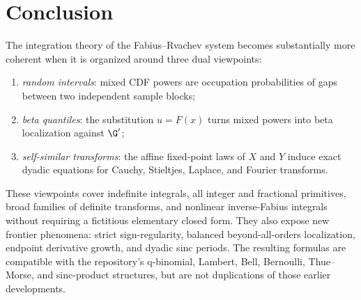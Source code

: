 \documentclass[11pt,oneside]{article}
\theoremstyle{definition}
\theoremstyle{remark}
\newcommand{\F}{F}
\newcommand{\1}{\mathbf 1}
\begin{document}
\section{Conclusion}

The integration theory of the Fabius--Rvachev system becomes substantially more
coherent when it is organized around three dual viewpoints:
\begin{enumerate}
 \item \emph{random intervals}: mixed CDF powers are occupation probabilities
       of gaps between two independent sample blocks;
 \item \emph{beta quantiles}: the substitution \(u=\F(x)\) turns mixed powers
       into beta localization against \(\G'\);
 \item \emph{self-similar transforms}: the affine fixed-point laws of \(X\) and
       \(Y\) induce exact dyadic equations for Cauchy, Stieltjes, Laplace, and
       Fourier transforms.
\end{enumerate}
These viewpoints cover indefinite integrals, all integer and fractional
primitives, broad families of definite transforms, and nonlinear inverse-Fabius
integrals without requiring a fictitious elementary closed form.  They also
expose new frontier phenomena: strict sign-regularity, balanced
beyond-all-orders localization, endpoint derivative growth, and dyadic sinc
periods.  The resulting formulas are compatible with the repository's
q-binomial, Lambert, Bell, Bernoulli, Thue--Morse, and sinc-product structures,
but are not duplications of those earlier developments.
\end{document}
